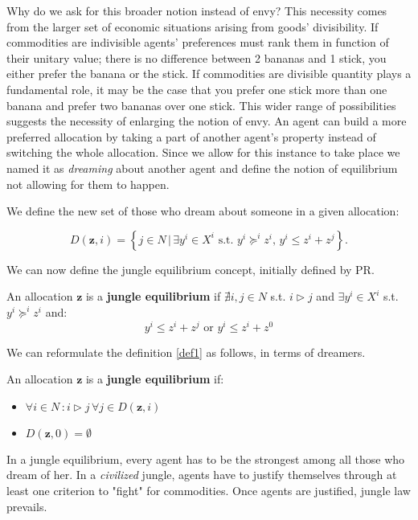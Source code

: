 Why do we ask for this broader notion instead of envy? This necessity comes from the larger set of economic situations arising from goods' divisibility. If commodities are indivisible agents' preferences must rank them in function of their unitary value; there is no difference between 2 bananas and 1 stick, you either prefer the banana or the stick. If commodities are divisible quantity plays a fundamental role, it may be the case that you prefer one stick more than one banana and prefer two bananas over one stick. This wider range of possibilities suggests the necessity of enlarging the notion of envy. An agent can build a more preferred allocation by taking a part of another agent's property instead of switching the whole allocation. Since we allow for this instance to take place we named it as \textit{dreaming} about another agent and define the notion of equilibrium not allowing for them to happen.

We define the new set of those who dream about someone in a given allocation:

\[ D(\textbf{z},i) = \left\{ j\in N\,|\,\exists y^i\in X^i \text{ s.t. } y^i\succeq^iz^i,\, y^i\leq z^i+z^j\right\}.\]

We can now define the jungle equilibrium concept, initially defined by PR\cite{P-R}.

\begin{definition}\label{def1}
    An allocation $\textbf{z}$ is a \textbf{jungle equilibrium} if $\nexists i,j\in N$ s.t. $i\triangleright j$ and $\exists y^i\in X^i$ s.t. $y^i\succeq^iz^i$ and:
    \[y^i\leq z^i+z^j\text{ or }y^i\leq z^i+z^0\]
\end{definition}

We can reformulate the definition \ref{def1} as follows, in terms of dreamers.

\begin{definition}\label{def2}
    An allocation $\textbf{z}$ is a \textbf{jungle equilibrium} if:
    \begin{itemize}
        \item $\forall i\in N\,:i\triangleright j\,\forall j\in D(\textbf{z},i)$
        \item $D(\textbf{z},0)=\emptyset$
    \end{itemize}
    
\end{definition}

In a jungle equilibrium, every agent has to be the strongest among all those who dream of her. In a \textit{civilized} jungle, agents have to justify themselves through at least one criterion to "fight" for commodities. Once agents are justified, jungle law prevails.

